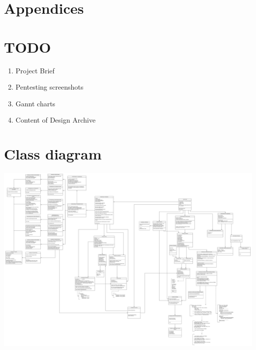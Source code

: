 \documentclass{article}
\begin{document}



\newpage
\tableofcontents

\newpage



\newpage









% 
\newpage


\section{Appendices}
\appendix


\section{TODO}
\begin{enumerate}
	\item Project Brief
	\item Pentesting screenshots
	\item Gannt charts
	\item Content of Design Archive
\end{enumerate}

\section{Class diagram}\label{sec:appendix-class-diag}

\begin{center}
	\begin{sideways}%
		\begin{minipage}{0.92\textheight}
			\includegraphics[width=\linewidth,keepaspectratio]{overall_class_diagram}
			\label{fig:xx}
		\end{minipage}
	\end{sideways}
\end{center}
\end{document}
